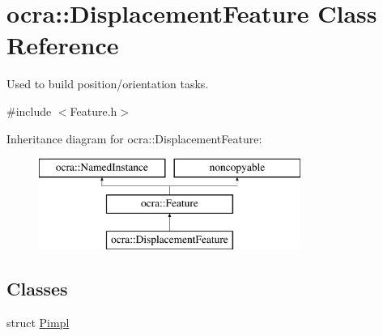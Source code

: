 \hypertarget{classocra_1_1DisplacementFeature}{}\section{ocra\+:\+:Displacement\+Feature Class Reference}
\label{classocra_1_1DisplacementFeature}


Used to build position/orientation tasks.  




{\ttfamily \#include $<$Feature.\+h$>$}

Inheritance diagram for ocra\+:\+:Displacement\+Feature\+:\begin{figure}[H]
\begin{center}
\leavevmode
\includegraphics[height=3.000000cm]{dd/dda/classocra_1_1DisplacementFeature}
\end{center}
\end{figure}
\subsection*{Classes}
\begin{DoxyCompactItemize}
\item 
struct \hyperlink{structocra_1_1DisplacementFeature_1_1Pimpl}{Pimpl}
\end{DoxyCompactItemize}
